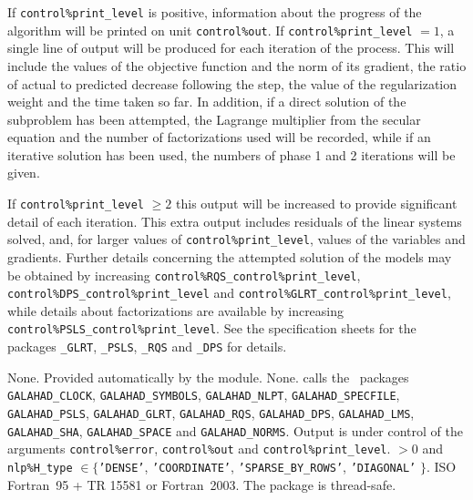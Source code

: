 \documentclass{galahad}
\newcommand{\packagename}{ARC}
\begin{document}
\galinfo
If {\tt control\%print\_level} is positive, information about the progress
of the algorithm will be printed on unit {\tt control\-\%out}.
If {\tt control\%print\_level} $= 1$, a single line of output will be produced
for each iteration of the process.
This will include the values of the objective function and the norm of its
gradient, the ratio of actual to predicted decrease following the step, the
value of the regularization weight and the time taken so far. In addition, if
a direct solution of the subproblem has been attempted, the
Lagrange multiplier from the secular equation and the number of factorizations
used will be recorded, while if an iterative solution has been used, the
numbers of phase 1 and 2 iterations will be given.

If {\tt control\%print\_level} $\geq 2$ this
output will be increased to provide significant detail of each iteration.
This extra output includes residuals of the linear systems solved, and,
for larger values of {\tt control\%print\_level}, values of the variables
and gradients. Further details concerning the attempted solution of the models
may be obtained by increasing
{\tt control\%RQS\_control\%print\_level},
{\tt control\%DPS\_control\%print\_level}
and
{\tt control\%GLRT\_control\%print\_level},
while details about factorizations are available
by increasing
{\tt control\%PSLS\_control\%print\_level}.
See the specification sheets for the packages
{\tt \libraryname\_GLRT},
{\tt \libraryname\_PSLS},
{\tt \libraryname\_RQS} and
{\tt \libraryname\_DPS}
for details.


\galgeneral

\galcommon None.
\galworkspace Provided automatically by the module.
\galroutines None.
\galmodules {\tt \packagename\_solve} calls the \galahad\ packages
{\tt GALAHAD\_CLOCK},
{\tt GALAHAD\_SY\-M\-BOLS}, \sloppy
{\tt GALAHAD\_NLPT},
{\tt GALAHAD\_SPECFILE},
{\tt GALAHAD\_PSLS},
{\tt GALAHAD\_GLRT},
{\tt GALAHAD\_RQS},
{\tt GALAHAD\_DPS},
{\tt GALAHAD\_LMS},
{\tt GALAHAD\_SHA},
{\tt GALAHAD\_SPACE} and
{\tt GALAHAD\_NORMS}.
\galio Output is under control of the arguments
 {\tt control\%error}, {\tt control\%out} and {\tt control\%print\_level}.
 $> 0$ and
{\tt nlp\%H\_type} $\in \{${\tt 'DENSE'},
 {\tt 'COORDINATE'}, {\tt 'SPARSE\_BY\_ROWS'}, {\tt 'DIAGONAL'} $\}$.
\galportability ISO Fortran~95 + TR 15581 or Fortran~2003.
The package is thread-safe.
\end{document}
